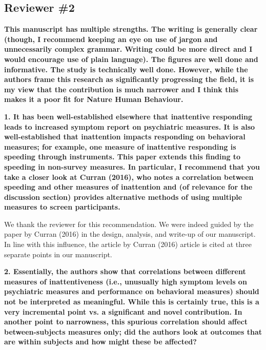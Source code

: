 \documentclass[a4paper,notitlepage,12pt]{article}
\begin{document}
\subsection*{Reviewer \#2}

\textbf{This manuscript has multiple strengths. The writing is generally clear (though, I recommend keeping an eye on use of jargon and unnecessarily complex grammar. Writing could be more direct and I would encourage use of plain language). The figures are well done and informative. The study is technically well done. However, while the authors frame this research as significantly progressing the field, it is my view that the contribution is much narrower and I think this makes it a poor fit for Nature Human Behaviour.}

\textbf{1. It has been well-established elsewhere that inattentive responding leads to increased symptom report on psychiatric measures. It is also well-established that inattention impacts responding on behavioral measures; for example, one measure of inattentive responding is speeding through instruments. This paper extends this finding to speeding in non-survey measures. In particular, I recommend that you take a closer look at Curran (2016), who notes a correlation between speeding and other measures of inattention and (of relevance for the discussion section) provides alternative methods of using multiple measures to screen participants.}

We thank the reviewer for this recommendation. We were indeed guided by the paper by Curran (2016) in the design, analysis, and write-up of our manuscript. In line with this influence, the article by Curran (2016) article is cited at three separate points in our manuscript.

\textbf{2. Essentially, the authors show that correlations between different measures of inattentiveness (i.e., unusually high symptom levels on psychiatric measures and performance on behavioral measures) should not be interpreted as meaningful. While this is certainly true, this is a very incremental point vs. a significant and novel contribution. In another point to narrowness, this spurious correlation should affect between-subjects measures only; did the authors look at outcomes that are within subjects and how might these be affected?}
\end{document}
